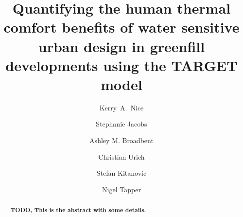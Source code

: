 \documentclass[final,3p,times,authoryear]{elsarticle}
\begin{document}
 


\begin{frontmatter}



\title{Quantifying the human thermal comfort benefits of water sensitive urban design in greenfill developments using the TARGET model}




\author[melb,monash,crc]{Kerry~A.~Nice}
\author[monash,crc,Mosiac]{Stephanie Jacobs}
\author[az1,az2]{Ashley M. Broadbent}
\author[monasheng]{Christian Urich}
\author[monasheng]{Stefan Kitanovic}
\author[monash,crc]{Nigel Tapper}



\address[melb]{Transport, Health, and Urban Design Hub, Faculty of Architecture, Building, and Planning, University of Melbourne, Victoria 3010, Australia}
\address[monash]{School of Earth, Atmosphere and Environment, Monash University, Clayton, VIC 3800, Australia}
\address[az1]{School of Geographical Sciences and Urban Planning, Arizona State University, Tempe, Arizona, USA}
\address[az2]{Urban Climate Research Center, Arizona State University, Tempe, Arizona, USA}
\address[crc]{Cooperative Research Centre for Water Sensitive Cities, Melbourne, Australia}
\address[Mosiac]{Mosiac Insights, Melbourne, Australia}
\address[monasheng]{Department of Civil Engineering, Monash University, Clayton, VIC 3800, Australia}




\begin{abstract}

\textbf{TODO, This is the abstract with some details.}


\end{abstract}
\end{frontmatter}
\end{document}
